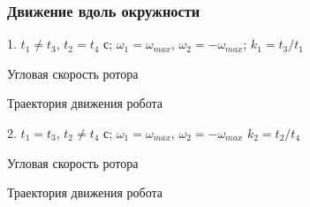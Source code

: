 \begin{frame}
\frametitle{Движение вдоль окружности}

1. $t_1 \neq t_3$, $t_2 = t_4$ с; \quad	$ \omega_1 = \omega_{max} $, $ \omega_2 = -\omega_{max} $; \quad $ k_1 = t_3 / t_1 $
		
	
	\begin{minipage}[t]{0.47\linewidth}
	{Угловая скорость ротора}
	\end{minipage}
	\hfill
	\begin{minipage}[t]{0.47\linewidth}
		{Траектория движения робота}
	\end{minipage}

\vspace{4mm}

2. $t_1 = t_3$, $t_2 \neq t_4$ с; \quad $ \omega_1 = \omega_{max} $, $ \omega_2 = -\omega_{max} $ \quad $ k_2 = t_2 / t_4 $

\begin{minipage}[t]{0.47\linewidth}
	{Угловая скорость ротора}
\end{minipage}
\hfill
\begin{minipage}[t]{0.47\linewidth}
	{Траектория движения робота}
\end{minipage}

\end{frame}


